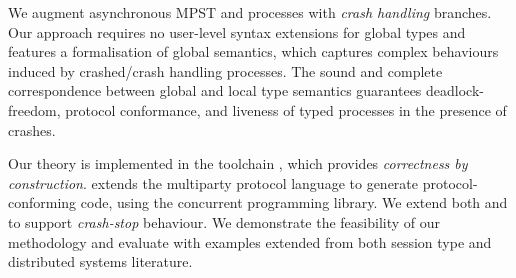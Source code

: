  We augment asynchronous MPST and processes with \emph{crash handling} branches.
 Our approach requires no user-level syntax extensions for global types
 and features a formalisation of global semantics, which captures
 complex behaviours induced by crashed/crash handling processes.
 The sound and complete correspondence between global and local type semantics
 guarantees deadlock-freedom, protocol conformance, and liveness of typed processes
 in the presence of crashes.

Our theory is implemented in the toolchain \theTool,
which provides \emph{correctness by construction}.
\theTool extends the \Scribble multiparty protocol language
to generate protocol-conforming \Scala code, using the \Effpi concurrent programming
library.
We extend both \Scribble and \Effpi
to support \emph{crash-stop} behaviour.
We demonstrate the feasibility of our methodology and evaluate
\theTool with examples extended from both
session type and distributed systems literature.

\fi

